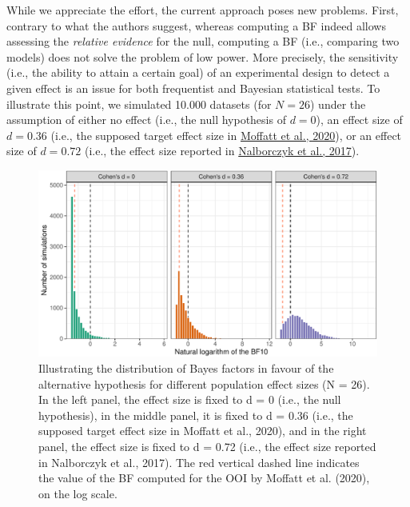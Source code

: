 \documentclass[
  english,
  man, donotrepeattitle,floatsintext]{apa6}
\begin{document}
While we appreciate the effort, the current approach poses new problems. First, contrary to what the authors suggest, whereas computing a BF indeed allows assessing the \emph{relative evidence} for the null, computing a BF (i.e., comparing two models) does not solve the problem of low power. More precisely, the sensitivity (i.e., the ability to attain a certain goal) of an experimental design to detect a given effect is an issue for both frequentist and Bayesian statistical tests. To illustrate this point, we simulated 10.000 datasets (for \(N = 26\)) under the assumption of either no effect (i.e., the null hypothesis of \(d = 0\)), an effect size of \(d = 0.36\) (i.e., the supposed target effect size in \protect\hyperlink{ref-moffatt_inner_2020}{Moffatt et al., 2020}), or an effect size of \(d = 0.72\) (i.e., the effect size reported in \protect\hyperlink{ref-nalborczyk_orofacial_2017}{Nalborczyk et al., 2017}).

\begin{figure}[!htb]

{\centering \includegraphics[width=1\linewidth]{manuscript_files/figure-latex/bf-dance-1} 

}

\caption{Illustrating the distribution of Bayes factors in favour of the alternative hypothesis for different population effect sizes (N = 26). In the left panel, the effect size is fixed to d = 0 (i.e., the null hypothesis), in the middle panel, it is fixed to d = 0.36 (i.e., the supposed target effect size in Moffatt et al., 2020), and in the right panel, the effect size is fixed to d = 0.72 (i.e., the effect size reported in Nalborczyk et al., 2017). The red vertical dashed line indicates the value of the BF computed for the OOI by Moffatt et al. (2020), on the log scale.}\label{fig:bf-dance}
\end{figure}
\end{document}
